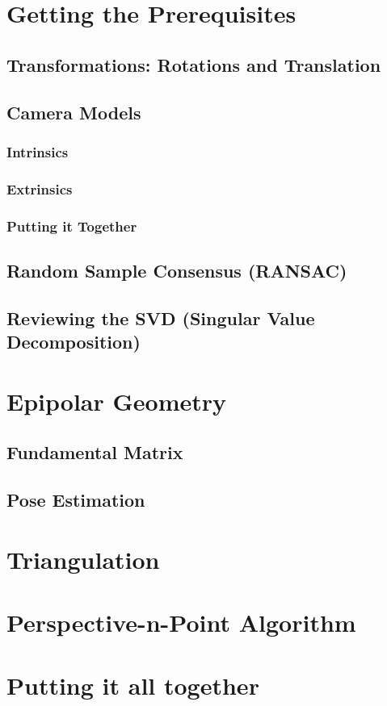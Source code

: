 \documentclass{article}
\begin{document}
    \section{Getting the Prerequisites}
        \subsection{Transformations: Rotations and Translation}

        \subsection{Camera Models}
            \subsubsection{Intrinsics}

            \subsubsection{Extrinsics}

            \subsubsection{Putting it Together}

        \subsection{Random Sample Consensus (RANSAC)}
        
        \subsection{Reviewing the SVD (Singular Value Decomposition)}

    \section{Epipolar Geometry} 
        \subsection{Fundamental Matrix}

        \subsection{Pose Estimation}

    \section{Triangulation}

    \section{Perspective-n-Point Algorithm}

    \section{Putting it all together}
\end{document}
